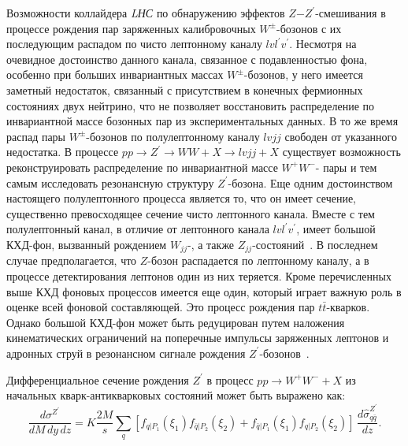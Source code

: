 Возможности коллайдера \textit{LНС} по обнаружению эффектов $Z$−$Z^\prime$-смешивания в процессе рождения пар заряженных калибровочных $W^±$-бозонов с их последующим распадом по чисто лептонному каналу $lvl^\prime v^\prime$. Несмотря на очевидное достоинство данного канала, связанное с подавленностью фона, особенно при больших инвариантных массах $W^±$-бозонов, у него имеется заметный недостаток, связанный с присутствием в конечных фермионных состояниях двух нейтрино, что не позволяет восстановить распределение по инвариантной массе бозонных пар из экспериментальных данных. В то же время распад пары $W^±$-бозонов по полулептонному каналу $lvjj$ свободен от указанного недостатка. В процессе $pp \rightarrow Z^\prime \rightarrow WW + X \rightarrow lvjj + X$ существует возможность реконструировать распределение по инвариантной массе $W^+W^-$- пары и тем самым исследовать резонансную структуру $Z^\prime$-бозона. Еще одним достоинством настоящего полулептонного процесса является то, что он имеет сечение, существенно превосходящее сечение чисто лептонного канала. Вместе с тем полулептонный канал, в отличие от лептонного канала $lvl^\prime v^\prime$, имеет большой КХД-фон, вызванный рождением $W_{jj}$-, а также $Z_{jj}$-состояний~\cite{ada-lvlv:2013}. В последнем случае предполагается, что $Z$-бозон распадается по лептонному каналу, а в процессе детектирования лептонов один из них теряется. Кроме перечисленных выше КХД фоновых процессов имеется еще один, который играет важную роль в оценке всей фоновой составляющей. Это процесс рождения пар $t\bar{t}$-кварков. Однако большой КХД-фон может быть редуцирован путем наложения кинематических ограничений на поперечные импульсы заряженных лептонов и адронных струй в резонансном сигнале рождения $Z^\prime$-бозонов~\cite{Bobovnikov:2016}.


Дифференциальное сечение рождения ${Z}^{\prime}$ в процесс $pp \rightarrow W^+W^- + X$ из начальных кварк-антикварковых состояний может быть выражено как:
\begin{equation} \label{dsigma}
\frac{d\sigma^{Z^\prime}}{dM\,dy\,dz}
= K \frac{2 M}{s}
\sum_q [f_{q|P_1}(\xi_1)f_{\bar q|P_2}(\xi_2) + f_{\bar
	q|P_1}(\xi_1)f_{q|P_2}(\xi_2)]\, \frac{d\hat \sigma_{q \bar
		q}^{Z^\prime}}{dz}.
\end{equation}

